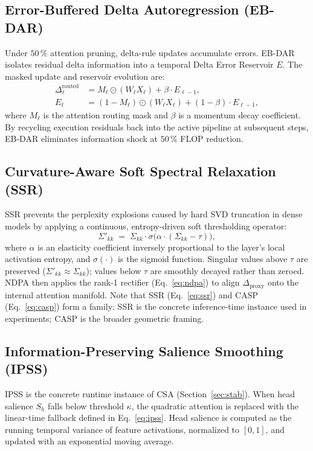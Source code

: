\documentclass[11pt]{article}
\newcommand{\dsig}{\Delta}
\newcommand{\proxydsig}{\ensuremath{\dsig_{\mathrm{proxy}}}}
\begin{document}
\subsection{Error-Buffered Delta Autoregression (EB-DAR)}
Under $50\,\%$ attention pruning, delta-rule updates accumulate errors.
EB-DAR isolates residual delta information into a temporal Delta Error
Reservoir $E$. The masked update and reservoir evolution are:
\begin{align}
  \dsig_\ell^{\mathrm{routed}} &= M_\ell \odot (W_\ell X_\ell) + \beta \cdot E_{\ell-1}, \label{eq:ebdar_out} \\
  E_\ell &= (1 - M_\ell) \odot (W_\ell X_\ell) + (1 - \beta) \cdot E_{\ell-1}, \label{eq:ebdar_res}
\end{align}
where $M_\ell$ is the attention routing mask and $\beta$ is a momentum decay
coefficient. By recycling execution residuals back into the active pipeline
at subsequent steps, EB-DAR eliminates information shock at $50\,\%$ FLOP
reduction.

\subsection{Curvature-Aware Soft Spectral Relaxation (SSR)}
SSR prevents the perplexity explosions caused by hard SVD truncation in
dense models by applying a continuous, entropy-driven soft thresholding
operator:
\begin{equation}\label{eq:ssr}
  \Sigma'_{kk} \;=\; \Sigma_{kk} \cdot \sigma\!\bigl(\alpha \cdot (\Sigma_{kk} - \tau)\bigr),
\end{equation}
where $\alpha$ is an elasticity coefficient inversely proportional to the
layer's local activation entropy, and $\sigma(\cdot)$ is the sigmoid function.
Singular values above $\tau$ are preserved ($\Sigma'_{kk}\!\approx\!\Sigma_{kk}$);
values below $\tau$ are smoothly decayed rather than zeroed. NDPA then
applies the rank-1 rectifier (Eq.~\ref{eq:ndpa}) to align $\proxydsig$ onto
the internal attention manifold. Note that SSR (Eq.~\ref{eq:ssr}) and CASP
(Eq.~\ref{eq:casp}) form a family: SSR is the concrete inference-time
instance used in experiments; CASP is the broader geometric framing.

\subsection{Information-Preserving Salience Smoothing (IPSS)}
IPSS is the concrete runtime instance of CSA (Section~\ref{sec:stab}). When
head salience $S_h$ falls below threshold $\kappa$, the quadratic attention
is replaced with the linear-time fallback defined in Eq.~\ref{eq:ipss}. Head
salience is computed as the running temporal variance of feature
activations, normalized to $[0,1]$, and updated with an exponential moving
average.
\end{document}
